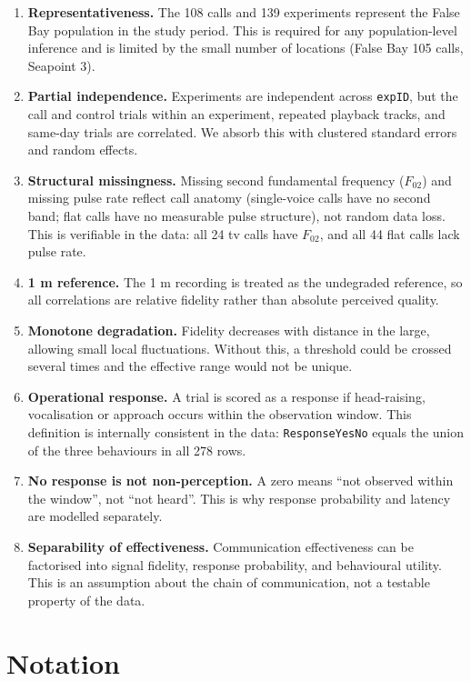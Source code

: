 \documentclass{apmcmthesis}
\begin{document}
\begin{enumerate}[label=\textbf{A\arabic*.},leftmargin=*]
\item \textbf{Representativeness.} The 108 calls and 139 experiments represent the False Bay
population in the study period. This is required for any population-level inference and is
limited by the small number of locations (False Bay 105 calls, Seapoint 3).
\item \textbf{Partial independence.} Experiments are independent across \texttt{expID}, but the
call and control trials within an experiment, repeated playback tracks, and same-day trials are
correlated. We absorb this with clustered standard errors and random effects.
\item \textbf{Structural missingness.} Missing second fundamental frequency ($F_{02}$) and
missing pulse rate reflect call anatomy (single-voice calls have no second band; flat calls
have no measurable pulse structure), not random data loss. This is verifiable in the data: all
24 tv calls have $F_{02}$, and all 44 flat calls lack pulse rate.
\item \textbf{1 m reference.} The 1 m recording is treated as the undegraded reference, so all
correlations are relative fidelity rather than absolute perceived quality.
\item \textbf{Monotone degradation.} Fidelity decreases with distance in the large, allowing small
local fluctuations. Without this, a threshold could be crossed several times and the effective
range would not be unique.
\item \textbf{Operational response.} A trial is scored as a response if head-raising, vocalisation
or approach occurs within the observation window. This definition is internally consistent in
the data: \texttt{ResponseYesNo} equals the union of the three behaviours in all 278 rows.
\item \textbf{No response is not non-perception.} A zero means ``not observed within the window'',
not ``not heard''. This is why response probability and latency are modelled separately.
\item \textbf{Separability of effectiveness.} Communication effectiveness can be factorised into
signal fidelity, response probability, and behavioural utility. This is an assumption about the
chain of communication, not a testable property of the data.
\end{enumerate}

\section{Notation}
\end{document}
